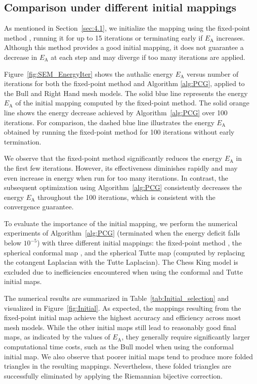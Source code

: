 \documentclass{article}
\numberwithin{equation}{section}
\def\rA{\mathrm{A}}
\begin{document}
\subsection{{ Comparison under different initial mappings}} \label{sec:6.2}
{

As mentioned in Section~\ref{sec:4.1}, we initialize the mapping using the fixed-point method \cite[Algorithm 4.3]{YuLL19}, running it for up to 15 iterations or terminating early if $E_\rA$ increases. Although this method provides a good initial mapping, it does not guarantee a decrease in $E_\rA$ at each step and may diverge if too many iterations are applied.

Figure~\ref{fig:SEM_EnergyIter} shows the authalic energy $E_\rA$ versus number of iterations for both the fixed-point method \cite[Algorithm 4.3]{YuLL19} and Algorithm \ref{alg:PCG}, applied to the Bull and Right Hand mesh models. The solid blue line represents the energy $E_\rA$ of the initial mapping computed by the fixed-point method. The solid orange line shows the energy decrease achieved by Algorithm~\ref{alg:PCG} over 100 iterations. For comparison, the dashed blue line illustrates the energy $E_\rA$ obtained by running the fixed-point method for 100 iterations without early termination.

We observe that the fixed-point method significantly reduces the energy $E_\rA$ in the first few iterations. However, its effectiveness diminishes rapidly and may even increase in energy when run for too many iterations. In contrast, the subsequent optimization using Algorithm~\ref{alg:PCG} consistently decreases the energy $E_\rA$ throughout the 100 iterations, which is consistent with the convergence guarantee.

To evaluate the importance of the initial mapping, we perform the numerical experiments of Algorithm~\ref{alg:PCG} (terminated when the energy deficit falls below $10^{-5}$) with three different initial mappings: the fixed-point method \cite[Algorithm 4.3]{YuLL19}, the spherical conformal map \cite{HaAT00}, and the spherical Tutte map \cite{HaAT00} (computed by replacing the cotangent Laplacian with the Tutte Laplacian). The Chess King model is excluded due to inefficiencies encountered when using the conformal and Tutte initial maps.

The numerical results are summarized in Table~\ref{tab:Initial_selection} and visualized in Figure~\ref{fig:Initial}. As expected, the mappings resulting from the fixed-point initial map achieve the highest accuracy and efficiency across most mesh models. While the other initial maps still lead to reasonably good final maps, as indicated by the values of $E_\rA$, they generally require significantly larger computational time costs, such as the Bull model when using the conformal initial map. We also observe that poorer initial maps tend to produce more folded triangles in the resulting mappings. Nevertheless, these folded triangles are successfully eliminated by applying the Riemannian bijective correction.

}
\end{document}
